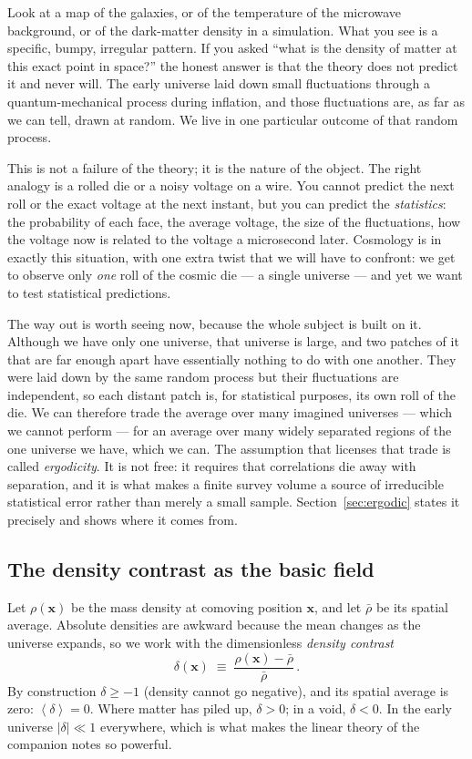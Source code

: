 \documentclass[12pt]{article}
\newcommand{\bx}{\mathbf{x}}
\newcommand{\avg}[1]{\left\langle #1 \right\rangle}
\begin{document}
Look at a map of the galaxies, or of the temperature of the microwave
background, or of the dark-matter density in a simulation.  What you see
is a specific, bumpy, irregular pattern.  If you asked ``what is the
density of matter at this exact point in space?'' the honest answer is
that the theory does not predict it and never will.  The early universe
laid down small fluctuations through a quantum-mechanical process during
inflation, and those fluctuations are, as far as we can tell, drawn at
random.  We live in one particular outcome of that random process.

This is not a failure of the theory; it is the nature of the object.
The right analogy is a rolled die or a noisy voltage on a wire.  You
cannot predict the next roll or the exact voltage at the next instant,
but you can predict the \emph{statistics}: the probability of each face,
the average voltage, the size of the fluctuations, how the voltage now
is related to the voltage a microsecond later.  Cosmology is in exactly
this situation, with one extra twist that we will have to confront: we
get to observe only \emph{one} roll of the cosmic die --- a single
universe --- and yet we want to test statistical predictions.

The way out is worth seeing now, because the whole subject is built on
it.  Although we have only one universe, that universe is large, and two
patches of it that are far enough apart have essentially nothing to do
with one another.  They were laid down by the same random process but
their fluctuations are independent, so each distant patch is, for
statistical purposes, its own roll of the die.  We can therefore trade
the average over many imagined universes --- which we cannot perform ---
for an average over many widely separated regions of the one universe we
have, which we can.  The assumption that licenses that trade is called
\emph{ergodicity}.  It is not free: it requires that correlations die
away with separation, and it is what makes a finite survey volume a
source of irreducible statistical error rather than merely a small
sample.  Section~\ref{sec:ergodic} states it precisely and shows where
it comes from.

\subsection{The density contrast as the basic field}

Let $\rho(\bx)$ be the mass density at comoving position $\bx$, and let
$\bar\rho$ be its spatial average.  Absolute densities are awkward
because the mean changes as the universe expands, so we work with the
dimensionless \emph{density contrast}
\begin{equation}
  \delta(\bx) \;\equiv\; \frac{\rho(\bx) - \bar\rho}{\bar\rho}\,.
  \label{eq:delta-def}
\end{equation}
By construction $\delta \ge -1$ (density cannot go negative), and its
spatial average is zero: $\avg{\delta} = 0$.  Where matter has piled up,
$\delta > 0$; in a void, $\delta < 0$.  In the early universe $|\delta|
\ll 1$ everywhere, which is what makes the linear theory of the
companion notes so powerful.
\end{document}
